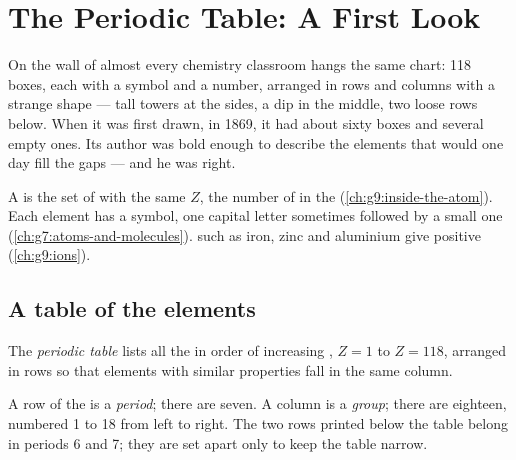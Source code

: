 \chapter{The Periodic Table: A First Look}\label{ch:g9:periodic-table-first-look}

On the wall of almost every chemistry classroom hangs the same chart: 118
boxes, each with a symbol and a number, arranged in rows and columns
with a strange shape --- tall towers at the sides, a dip in the middle,
two loose rows below. When it was first drawn, in 1869, it had about
sixty boxes and several empty ones. Its author was bold enough to
describe the elements that would one day fill the gaps --- and he was
right.

\begin{recall}
A  is the set of  with the same  $Z$,
the number of  in the  (\cref{ch:g9:inside-the-atom}).
Each element has a symbol, one capital letter sometimes followed by a
small one (\cref{ch:g7:atoms-and-molecules}).  such as iron, zinc
and aluminium give positive  (\cref{ch:g9:ions}).
\end{recall}

\section{A table of the elements}

\begin{definition}\label{def:g9:periodic-table-first-look:periodic-table}
The \emph{periodic table} lists all the  in order of increasing , $Z = 1$ to $Z = 118$,
arranged in rows so that elements with similar properties fall in the
same column.
\end{definition}

\begin{definition}\label{def:g9:periodic-table-first-look:period}
A row of the  is a \emph{period}; there are
seven. A column is a \emph{group}; there are eighteen,
numbered 1 to 18 from left to right. The two rows printed below the
table belong in periods 6 and 7; they are set apart only to keep the
table narrow.
\end{definition}

